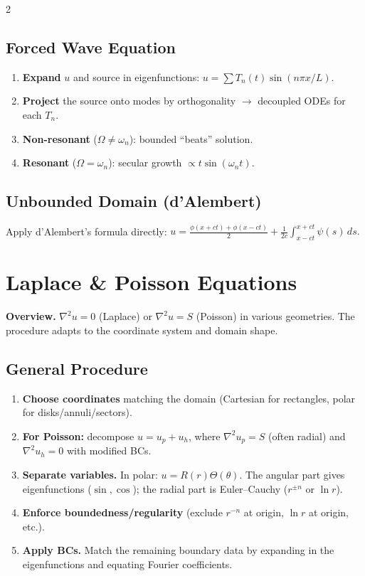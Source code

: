 \documentclass[a4paper,9pt]{article}
\begin{document}
\begin{multicols}{2}
\subsection{Forced Wave Equation}
\begin{enumerate}
\item \textbf{Expand} $u$ and source in eigenfunctions: $u=\sum T_n(t)\sin(n\pi x/L)$.
\item \textbf{Project} the source onto modes by orthogonality $\to$ decoupled ODEs for each $T_n$.
\item \textbf{Non-resonant} ($\Omega\ne\omega_n$): bounded ``beats'' solution.
\item \textbf{Resonant} ($\Omega=\omega_n$): secular growth $\propto t\sin(\omega_n t)$.
\end{enumerate}

\subsection{Unbounded Domain (d'Alembert)}
Apply d'Alembert's formula directly:
$u = \frac{\phi(x+ct)+\phi(x-ct)}{2}+\frac{1}{2c}\int_{x-ct}^{x+ct}\psi(s)\,ds.$

\section{Laplace \& Poisson Equations}

\textbf{Overview.} $\nabla^2 u = 0$ (Laplace) or $\nabla^2 u = S$ (Poisson) in various geometries. The procedure adapts to the coordinate system and domain shape.

\subsection{General Procedure}
\begin{enumerate}
\item \textbf{Choose coordinates} matching the domain (Cartesian for rectangles, polar for disks/annuli/sectors).
\item \textbf{For Poisson:} decompose $u = u_p + u_h$, where $\nabla^2 u_p = S$ (often radial) and $\nabla^2 u_h = 0$ with modified BCs.
\item \textbf{Separate variables.} In polar: $u=R(r)\Theta(\theta)$. The angular part gives eigenfunctions ($\sin,\cos$); the radial part is Euler--Cauchy ($r^{\pm n}$ or $\ln r$).
\item \textbf{Enforce boundedness/regularity} (exclude $r^{-n}$ at origin, $\ln r$ at origin, etc.).
\item \textbf{Apply BCs.} Match the remaining boundary data by expanding in the eigenfunctions and equating Fourier coefficients.
\end{enumerate}


\end{multicols}
\end{document}
